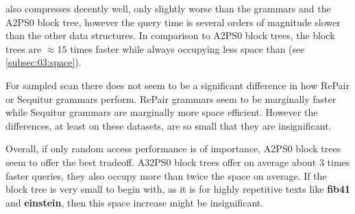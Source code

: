 \documentclass{scrartcl}
\begin{document}
\lzend{} also compresses decently well, only slightly worse than the grammars and the A2PS0 block tree, however the query time is several orders of magnitude slower than the other data structures.
In comparison to A2PS0 block trees, the block trees are $\approx 15$ times faster while always occupying less space than \lzend{} (see \cref{subsec:03:space}).

For sampled scan there does not seem to be a significant difference in how RePair or Sequitur grammars perform.
RePair grammars seem to be marginally faster while Sequitur grammars are marginally more space efficient.
However the differences, at least on these datasets, are so small that they are insignificant.

Overall, if only random access performance is of importance, A2PS0 block trees seem to offer the best tradeoff.
A32PS0 block trees offer on average about $3$ times faster queries, they also occupy more than twice the space on average.
If the block tree is very small to begin with, as it is for highly repetitive texts like \textbf{fib41} and \textbf{einstein}, then this space increase might be insignificant.
\end{document}

